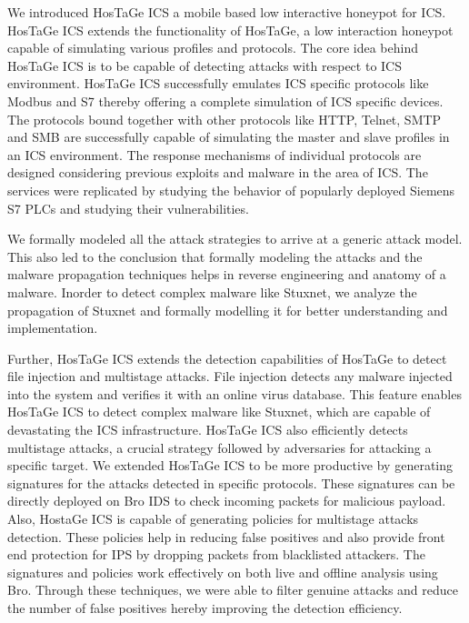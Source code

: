 \documentclass[article,msc=informatik,type=msc,colorback,accentcolor=tud9c]{tudthesis}
\begin{document}
	\vspace{3mm}
	We introduced HosTaGe ICS a mobile based low interactive honeypot for ICS. HosTaGe ICS extends the functionality of HosTaGe, a low interaction honeypot capable of simulating various profiles and protocols. The core idea behind HosTaGe ICS is to be capable of detecting attacks with respect to \ac{ICS} environment. HosTaGe ICS successfully emulates \ac{ICS} specific protocols like Modbus and S7 thereby offering a complete simulation of \ac{ICS} specific devices.  The protocols bound together with other protocols like HTTP, Telnet, \ac{SMTP} and \ac{SMB} are successfully capable of simulating the master and slave profiles in an \ac{ICS} environment. The response mechanisms of individual protocols are designed considering previous exploits and malware in the area of \ac{ICS}. The services were replicated by studying the behavior of popularly deployed Siemens S7 \ac{PLC}s and studying their vulnerabilities.


	\vspace{3mm}
 	We formally modeled all the attack strategies to arrive at a generic attack model. This also led to the conclusion that formally modeling the attacks and the malware propagation techniques helps in reverse engineering and anatomy of a malware.  Inorder to detect complex malware like Stuxnet, we analyze the propagation of Stuxnet and formally modelling it for better understanding and implementation.


	\vspace{3mm}
	Further, HosTaGe ICS extends the detection capabilities of HosTaGe to detect file injection and multistage attacks. File injection detects any malware injected into the system  and verifies it with an online virus database. This feature enables HosTaGe ICS to detect complex malware like Stuxnet,  which are capable of devastating the \ac{ICS} infrastructure.  HosTaGe ICS also efficiently detects multistage attacks, a crucial strategy followed by adversaries for attacking a specific target. We extended HosTaGe ICS to be more productive by generating signatures for the attacks detected in specific protocols. These signatures can be directly deployed on Bro IDS to check incoming packets for malicious payload. Also, HostaGe ICS is capable of generating policies for multistage attacks detection. These policies help in reducing false positives and also provide front end protection for \ac{IPS} by dropping packets from blacklisted attackers.  The signatures and policies work effectively on both live and offline analysis using Bro.  Through these techniques, we were able to filter genuine attacks and reduce the number of false positives hereby improving the detection efficiency. 
\end{document}

